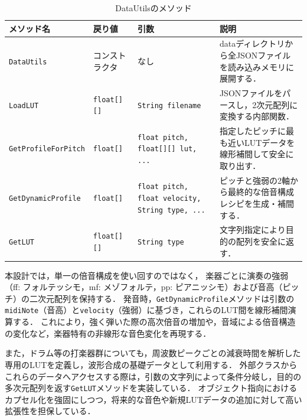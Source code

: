 \documentclass[lualatex,book,paper=a4paper,jafontsize=11.5pt,jafontscale=1.05]{jlreq}
\begin{document}
\begin{table}[H]
    \centering
    \caption{DataUtilsのメソッド}
    \label{table:datautils_methods}
    \begin{tabular}{|l|l|p{3.5cm}|p{4cm}|}
        \hline
        \textbf{メソッド名} & \textbf{戻り値} & \textbf{引数} & \textbf{説明} \\ \hline
        \texttt{DataUtils} & コンストラクタ & なし & dataディレクトリから全JSONファイルを読み込みメモリに展開する． \\ \hline
        \texttt{LoadLUT} & \texttt{float[][]} & \texttt{String filename} & JSONファイルをパースし，2次元配列に変換する内部関数． \\ \hline
        \texttt{GetProfileForPitch} & \texttt{float[]} & \texttt{float pitch, \newline float[][] lut, ...} & 指定したピッチに最も近いLUTデータを線形補間して安全に取り出す． \\ \hline
        \texttt{GetDynamicProfile} & \texttt{float[]} & \texttt{float pitch, \newline float velocity, \newline String type, ...} & ピッチと強弱の2軸から最終的な倍音構成レシピを生成・補間する． \\ \hline
        \texttt{GetLUT} & \texttt{float[][]} & \texttt{String type} & 文字列指定により目的の配列を安全に返す． \\ \hline
    \end{tabular}
\end{table}

本設計では，単一の倍音構成を使い回すのではなく，
楽器ごとに演奏の強弱（ff: フォルテッシモ，mf: メゾフォルテ，pp: ピアニッシモ）および音高（ピッチ）の二次元配列を保持する．
発音時，\texttt{GetDynamicProfile}メソッドは引数の\texttt{midiNote}（音高）と\texttt{velocity}（強弱）に基づき，これらのLUT間を線形補間演算する．
これにより，強く弾いた際の高次倍音の増加や，音域による倍音構造の変化など，楽器特有の非線形な音色変化を再現する．

また，ドラム等の打楽器群についても，周波数ピークごとの減衰時間を解析した専用のLUTを定義し，波形合成の基礎データとして利用する．
外部クラスからこれらのデータへアクセスする際は，引数の文字列によって条件分岐し，目的の多次元配列を返す\texttt{GetLUT}メソッドを実装している．
オブジェクト指向におけるカプセル化を強固にしつつ，将来的な音色や新規LUTデータの追加に対して高い拡張性を担保している．
\end{document}
